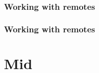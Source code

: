 \documentclass{beamer}
\begin{document}
    \begin{frame}
        \frametitle{Working with remotes}
        \begin{figure}[H]
            \centering
            \noindent
        \end{figure}
    \end{frame}
    \begin{frame}
        \frametitle{Working with remotes}
        \begin{figure}[H]
            \centering
            \noindent
        \end{figure}
    \end{frame}


    \section{Mid}\label{sec:mid}
\end{document}
